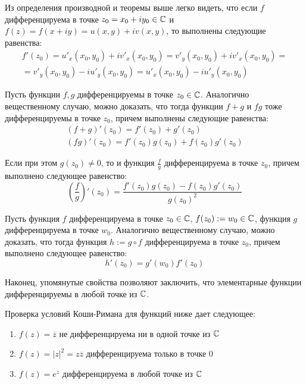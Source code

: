 \begin{note}
	Из определения производной и теоремы выше легко видеть, что если $f$ дифференцируема в точке $z_0 = x_0 + iy_0 \in \mathbb{C}$ и $f(z) = f(x + iy) = u(x, y) + iv(x, y)$, то выполнены следующие равенства:
	\begin{multline*}
		f'(z_0) = u'_x(x_0, y_0) + iv'_x(x_0, y_0) = v'_y(x_0, y_0) + iv'_x(x_0, y_0) =
		\\
		= v'_y(x_0, y_0) - iu'_y(x_0, y_0) = u'_x(x_0, y_0) - iu'_y(x_0, y_0)
	\end{multline*}
\end{note}

\begin{note}
	Пусть функции $f, g$ дифференцируемы в точке $z_0 \in \mathbb{C}$. Аналогично вещественному случаю, можно доказать, что тогда функции $f + g$ и $fg$ тоже дифференцируемы в точке $z_0$, причем выполнены следующие равенства:
	\begin{gather*}
		(f + g)'(z_0) = f'(z_0) + g'(z_0)\\
		(fg)'(z_0) = f'(z_0)g(z_0) + f(z_0)g'(z_0)
	\end{gather*}
	
	Если при этом $g(z_0) \ne 0$, то и функция $\frac fg$ дифференцируема в точке $z_0$, причем выполнено следующее равенство:
	\[
	\left(\frac fg\right)'(z_0) = \frac{f'(z_0)g(z_0) - f(z_0)g'(z_0)}{g(z_0)^2}\]
\end{note}

\begin{note}
	Пусть функция $f$ дифференцируема в точке $z_0 \in \mathbb{C}$, $f(z_0) := w_0 \in \mathbb{C}$, функция $g$ дифференцируема в точке $w_0$. Аналогично вещественному случаю, можно доказать, что тогда функция $h := g \circ f$ дифференцируема в точке $z_0$, причем выполнено следующее равенство:
	\[h'(z_0) = g'(w_0)f'(z_0)\]
	
	Наконец, упомянутые свойства позволяют заключить, что элементарные функции дифференцируемы в любой точке из $\mathbb{C}$.
\end{note}

\begin{example}
	Проверка условий Коши-Римана для функций ниже дает следующее:
	\begin{enumerate}
		\item $f(z) =\overline{z}$ не дифференцируема ни в одной точке из $\mathbb{C}$
		\item $f(z) = |z|^2 = z\overline{z}$ дифференцируема только в точке $0$
		\item $f(z) = e^z$ дифференцируема в любой точке из $\mathbb{C}$
	\end{enumerate}
\end{example}

